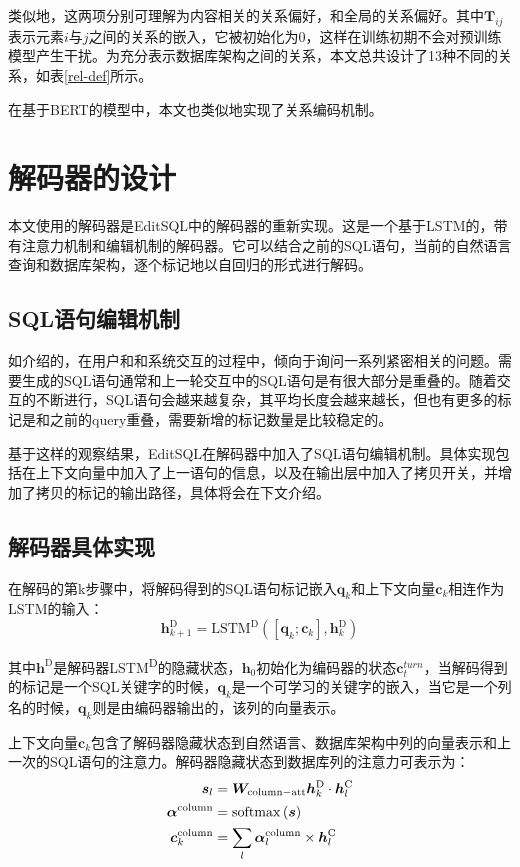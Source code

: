 类似地，这两项分别可理解为内容相关的关系偏好，和全局的关系偏好。其中$\bm{T}_{ij}$表示元素$i$与$j$之间的关系的嵌入，它被初始化为0，这样在训练初期不会对预训练模型产生干扰。为充分表示数据库架构之间的关系，本文总共设计了13种不同的关系，如表\ref{rel-def}所示。

在基于BERT的模型中，本文也类似地实现了关系编码机制。

\section{解码器的设计}

本文使用的解码器是EditSQL\cite{edit19}中的解码器的重新实现。这是一个基于LSTM的，带有注意力机制和编辑机制的解码器。它可以结合之前的SQL语句，当前的自然语言查询和数据库架构，逐个标记地以自回归的形式进行解码。

\subsection{SQL语句编辑机制}

如\citet{edit19}介绍的，在用户和和系统交互的过程中，倾向于询问一系列紧密相关的问题。需要生成的SQL语句通常和上一轮交互中的SQL语句是有很大部分是重叠的。随着交互的不断进行，SQL语句会越来越复杂，其平均长度会越来越长，但也有更多的标记是和之前的query重叠，需要新增的标记数量是比较稳定的。

基于这样的观察结果，EditSQL\cite{edit19}在解码器中加入了SQL语句编辑机制。具体实现包括在上下文向量中加入了上一语句的信息，以及在输出层中加入了拷贝开关，并增加了拷贝的标记的输出路径，具体将会在下文介绍。

\subsection{解码器具体实现}

在解码的第k步骤中，将解码得到的SQL语句标记嵌入$\bm{q}_k$和上下文向量$\bm{c}_k$相连作为LSTM的输入：
\begin{equation}
    \bm{h}_{k+1}^\mathrm{D}=\mathrm{LSTM^D}\left(\left[\bm{q}_k;\bm{c}_k\right],\bm{h}_k^\mathrm{D}\right)
\end{equation}

其中$\bm{h}^\mathrm{D}$是解码器LSTM\textsuperscript{D}的隐藏状态，$\bm{h}_0$初始化为编码器的状态$\bm{c}_t^{turn}$，当解码得到的标记是一个SQL关键字的时候，$\bm{q}_k$是一个可学习的关键字的嵌入，当它是一个列名的时候，$\bm{q}_k$则是由编码器输出的，该列的向量表示。

上下文向量$\bm{c}_k$包含了解码器隐藏状态到自然语言、数据库架构中列的向量表示和上一次的SQL语句的注意力。解码器隐藏状态到数据库列的注意力可表示为：
\begin{align}
    \bm{s}_l&=\bm{W}_\mathrm{column-att}\bm{h}_k^\mathrm{D}\cdot\bm{h}_l^\mathrm{C}\\
    \bm{\alpha}^\mathrm{column}&=\mathrm{softmax}\left(\bm{s}\right)\\
    \bm{c}_k^\mathrm{column}&=\sum_{l}{\bm{\alpha}_l^\mathrm{column}\times\bm{h}_l^\mathrm{C}}
\end{align}

